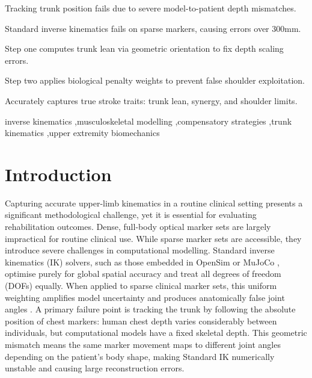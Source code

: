 \documentclass[12pt, a4paper]{elsarticle}
\begin{document}
\begin{frontmatter}
\begin{highlights}
\item Tracking trunk position fails due to severe model-to-patient depth mismatches.
\item Standard inverse kinematics fails on sparse markers, causing errors over 300mm.
\item Step one computes trunk lean via geometric orientation to fix depth scaling errors.
\item Step two applies biological penalty weights to prevent false shoulder exploitation.
\item Accurately captures true stroke traits: trunk lean, synergy, and shoulder limits.
\end{highlights}

\begin{keyword}
inverse kinematics \sep musculoskeletal modelling \sep compensatory strategies \sep trunk kinematics \sep upper extremity biomechanics
\end{keyword}

\end{frontmatter}

\section{Introduction}
\label{sec:intro}

Capturing accurate upper-limb kinematics in a routine clinical setting presents a significant methodological challenge, yet it is essential for evaluating rehabilitation outcomes. Dense, full-body optical marker sets are largely impractical for routine clinical use. While sparse marker sets are accessible, they introduce severe challenges in computational modelling. Standard inverse kinematics (IK) solvers, such as those embedded in OpenSim \cite{delp2007} or MuJoCo \cite{todorov2012}, optimise purely for global spatial accuracy and treat all degrees of freedom (DOFs) equally. When applied to sparse clinical marker sets, this uniform weighting amplifies model uncertainty and produces anatomically false joint angles \cite{uchida2022}. A primary failure point is tracking the trunk by following the absolute position of chest markers: human chest depth varies considerably between individuals, but computational models have a fixed skeletal depth. This geometric mismatch means the same marker movement maps to different joint angles depending on the patient's body shape, making Standard IK numerically unstable and causing large reconstruction errors.
\end{document}
